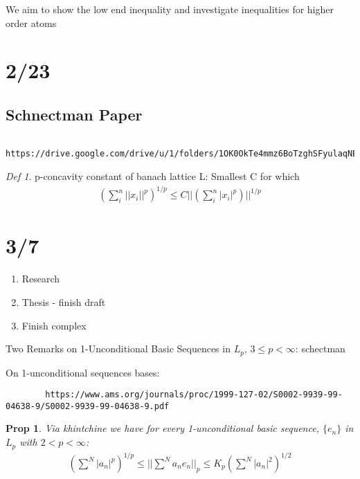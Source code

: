 \documentclass[11pt]{article}
\newtheorem{prop}{Prop}
\theoremstyle{remark}
\newtheorem*{defi}{Def}
\begin{document}
\begin{remark}
	We aim to show the low end inequality and investigate inequalities for higher order atoms
\end{remark}

\section{2/23}

\subsection{Schnectman Paper}

\begin{verbatim}
	https://drive.google.com/drive/u/1/folders/1OK0OkTe4mmz6BoTzghSFyulaqNEpw1ML
\end{verbatim}

\begin{defi}
	p-concavity constant of banach lattice L: Smallest C for which
	\begin{align*}
		(\sum_i^n ||x_i||^p)^{1/p} \leq C ||(\sum_i^n |x_i|^p)||^{1/p}
	\end{align*}
\end{defi}


\section{3/7}

\begin{enumerate}
	\item Research
	\item Thesis - finish draft
	\item Finish complex
\end{enumerate}

\begin{remark}
	Two Remarks on 1-Unconditional Basic Sequences in $L_p$, $3 \leq p < \infty$: schectman
\end{remark}

\begin{remark}
	On 1-unconditional sequences bases: 
	\begin{verbatim}
		https://www.ams.org/journals/proc/1999-127-02/S0002-9939-99-04638-9/S0002-9939-99-04638-9.pdf
	\end{verbatim}
\end{remark}

\begin{prop}
	Via khintchine we have for every 1-unconditional basic sequence, $\{e_n\}$ in $L_p$ with $2 < p < \infty$:
	\begin{align*}
		(\sum^N |a_n|^p)^{1/p} \leq || \sum^N a_n e_n||_p \leq K_p (\sum^N |a_n|^2)^{1/2}
	\end{align*}
\end{prop}
\end{document}
